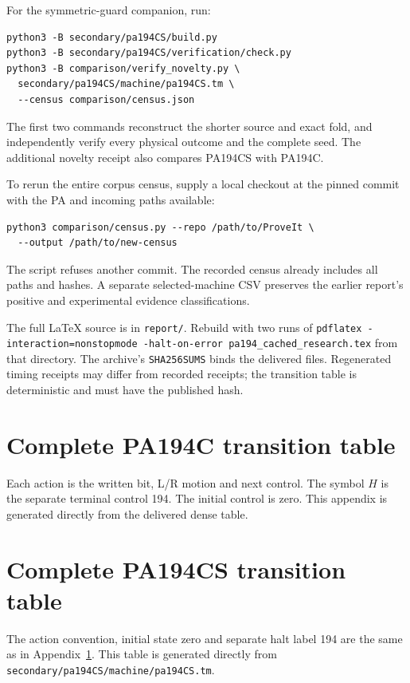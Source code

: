 \documentclass[11pt,letterpaper]{article}
\newcommand{\file}[1]{\texttt{\nolinkurl{#1}}}
\begin{document}
For the symmetric-guard companion, run:
\begin{verbatim}
python3 -B secondary/pa194CS/build.py
python3 -B secondary/pa194CS/verification/check.py
python3 -B comparison/verify_novelty.py \
  secondary/pa194CS/machine/pa194CS.tm \
  --census comparison/census.json
\end{verbatim}
The first two commands reconstruct the shorter source and exact fold,
and independently verify every physical outcome and the complete seed.
The additional novelty receipt also compares PA194CS with PA194C.

To rerun the entire corpus census, supply a local checkout at the pinned
commit with the PA and incoming paths available:
\begin{verbatim}
python3 comparison/census.py --repo /path/to/ProveIt \
  --output /path/to/new-census
\end{verbatim}
The script refuses another commit. The recorded census already includes
all paths and hashes. A separate selected-machine CSV preserves the
earlier report's positive and experimental evidence classifications.

The full LaTeX source is in \file{report/}. Rebuild with two runs of
\file{pdflatex -interaction=nonstopmode -halt-on-error pa194_cached_research.tex}
from that directory. The archive's \file{SHA256SUMS} binds the delivered
files. Regenerated timing receipts may differ from recorded receipts;
the transition table is deterministic and must have the published hash.

\clearpage
\appendix
\section{Complete PA194C transition table}\label{app:table}
Each action is the written bit, L/R motion and next control. The symbol
$H$ is the separate terminal control 194. The initial control is zero.
This appendix is generated directly from the delivered dense table.


\clearpage
\section{Complete PA194CS transition table}\label{app:tablecs}
The action convention, initial state zero and separate halt label 194
are the same as in Appendix~\ref{app:table}. This table is generated
directly from \file{secondary/pa194CS/machine/pa194CS.tm}.

\end{document}
